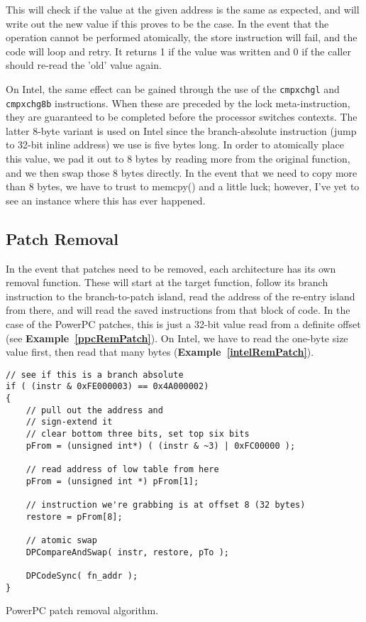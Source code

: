 \documentclass[english]{article}
\begin{document}
This will check if the value at the given address is the same as expected, and will write out the new value if this proves to be the case. In the event that the operation cannot be performed atomically, the store instruction will fail, and the code will loop and retry. It returns 1 if the value was written and 0 if the caller should re-read the 'old' value again.

On Intel, the same effect can be gained through the use of the \texttt{cmpxchgl} and \texttt{cmpxchg8b} instructions. When these are preceded by the lock meta-instruction, they are guaranteed to be completed before the processor switches contexts. The latter 8-byte variant is used on Intel since the branch-absolute instruction (jump to 32-bit inline address) we use is five bytes long. In order to atomically place this value, we pad it out to 8 bytes by reading more from the original function, and we then swap those 8 bytes directly. In the event that we need to copy more than 8 bytes, we have to trust to memcpy() and a little luck; however, I've yet to see an instance where this has ever happened.

\subsection{Patch Removal}
In the event that patches need to be removed, each architecture has its own removal function. These will start at the target function, follow its branch instruction to the branch-to-patch island, read the address of the re-entry island from there, and will read the saved instructions from that block of code. In the case of the PowerPC patches, this is just a 32-bit value read from a definite offset (see \textbf{Example~\ref{ppcRemPatch}}). On Intel, we have to read the one-byte size value first, then read that many bytes (\textbf{Example~\ref{intelRemPatch}}).

\begin{sourcecode}
\begin{verbatim}
// see if this is a branch absolute
if ( (instr & 0xFE000003) == 0x4A000002)
{
    // pull out the address and
    // sign-extend it
    // clear bottom three bits, set top six bits
    pFrom = (unsigned int*) ( (instr & ~3) | 0xFC00000 );

    // read address of low table from here
    pFrom = (unsigned int *) pFrom[1];

    // instruction we're grabbing is at offset 8 (32 bytes)
    restore = pFrom[8];

    // atomic swap
    DPCompareAndSwap( instr, restore, pTo );

    DPCodeSync( fn_addr );
}
\end{verbatim}
\caption{PowerPC patch removal algorithm.}
\label{ppcRemPatch}
\end{sourcecode}
\end{document}
